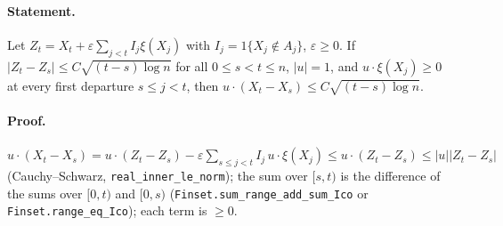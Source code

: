 \paragraph{Statement.} Let $Z_t=X_t+\varepsilon\sum_{j<t}I_j\xi(X_j)$ with $I_j=1\{X_j\notin A_j\}$, $\varepsilon\ge0$.
If $|Z_t-Z_s|\le C\sqrt{(t-s)\log n}$ for all $0\le s<t\le n$, $|u|=1$, and $u\cdot\xi(X_j)\ge0$ at every
first departure $s\le j<t$, then $u\cdot(X_t-X_s)\le C\sqrt{(t-s)\log n}$.
\paragraph{Proof.} $u\cdot(X_t-X_s)=u\cdot(Z_t-Z_s)-\varepsilon\sum_{s\le j<t}I_j\,u\cdot\xi(X_j)
\le u\cdot(Z_t-Z_s)\le|u||Z_t-Z_s|$ (Cauchy--Schwarz, \texttt{real\_inner\_le\_norm}); the sum over
$[s,t)$ is the difference of the sums over $[0,t)$ and $[0,s)$ (\texttt{Finset.sum\_range\_add\_sum\_Ico}
or \texttt{Finset.range\_eq\_Ico}); each term is $\ge0$.
